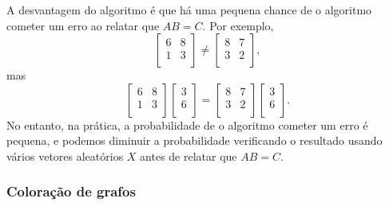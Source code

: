 A desvantagem do algoritmo é
que há uma pequena chance de o algoritmo
cometer um erro ao relatar que $AB=C$.
Por exemplo,
\[
 \begin{bmatrix}
  6 & 8 \\
  1 & 3 \\
 \end{bmatrix}
\neq
 \begin{bmatrix}
  8 & 7 \\
  3 & 2 \\
 \end{bmatrix},
\]
mas
\[
 \begin{bmatrix}
  6 & 8 \\
  1 & 3 \\
 \end{bmatrix}
 \begin{bmatrix}
  3 \\
  6 \\
 \end{bmatrix}
=
 \begin{bmatrix}
  8 & 7 \\
  3 & 2 \\
 \end{bmatrix}
 \begin{bmatrix}
  3 \\
  6 \\
 \end{bmatrix}.
\]
No entanto, na prática, a probabilidade de o
algoritmo cometer um erro é pequena,
e podemos diminuir a probabilidade
verificando o resultado usando vários vetores aleatórios $X$
antes de relatar que $AB=C$.

\subsubsection{Coloração de grafos}


